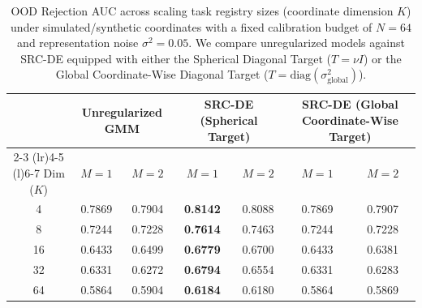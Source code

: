 \begin{table}[t]
\caption{OOD Rejection AUC across scaling task registry sizes (coordinate dimension $K$) under simulated/synthetic coordinates with a fixed calibration budget of $N=64$ and representation noise $\sigma^2=0.05$. We compare unregularized models against SRC-DE equipped with either the Spherical Diagonal Target ($T = \nu I$) or the Global Coordinate-Wise Diagonal Target ($T = \text{diag}(\sigma^2_{\text{global}})$).}
\label{submission:tab:scaling_k}
\vskip 0.15in
\begin{center}
\begin{small}
\begin{tabular}{ccccccc}
\toprule
& \multicolumn{2}{c}{\bf Unregularized GMM} & \multicolumn{2}{c}{\bf SRC-DE (Spherical Target)} & \multicolumn{2}{c}{\bf SRC-DE (Global Coordinate-Wise Target)} \\
\cmidrule(r){2-3} \cmidrule(lr){4-5} \cmidrule(l){6-7}
Dim ($K$) & $M=1$ & $M=2$ & $M=1$ & $M=2$ & $M=1$ & $M=2$ \\
\midrule
4  & 0.7869 & 0.7904 & \bf 0.8142 & 0.8088 & 0.7869 & 0.7907 \\
8  & 0.7244 & 0.7228 & \bf 0.7614 & 0.7463 & 0.7244 & 0.7228 \\
16 & 0.6433 & 0.6499 & \bf 0.6779 & 0.6700 & 0.6433 & 0.6381 \\
32 & 0.6331 & 0.6272 & \bf 0.6794 & 0.6554 & 0.6331 & 0.6283 \\
64 & 0.5864 & 0.5904 & \bf 0.6184 & 0.6180 & 0.5864 & 0.5869 \\
\bottomrule
\end{tabular}
\end{small}
\end{center}
\vskip -0.1in
\end{table}

